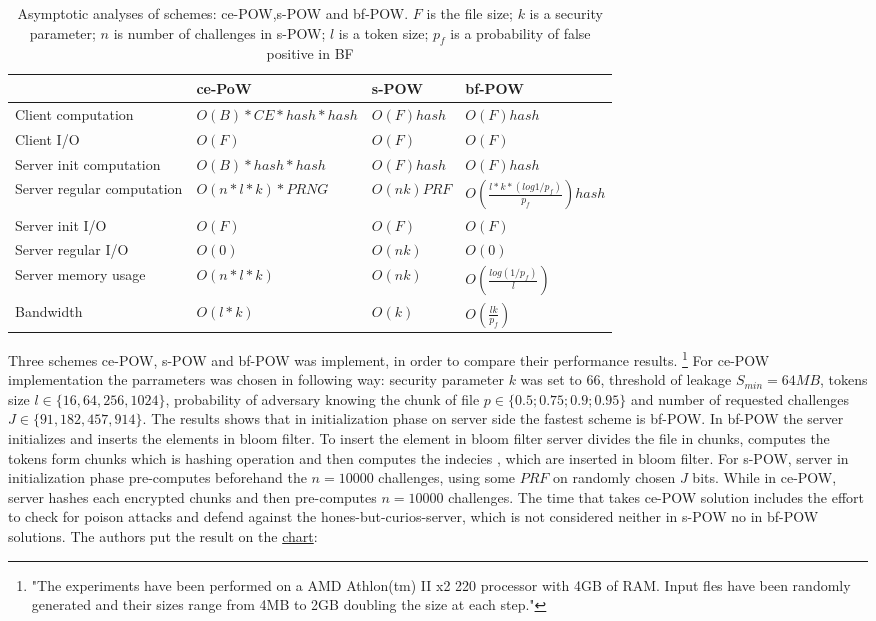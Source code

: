 \documentclass[12pt]{article}
\begin{document}
\begin{savenotes}
\begin{table}[!htpb]
\centering
\addtolength{\tabcolsep}{3pt}
\begin{tabular}{|L{4cm}|L{4cm}|L{2.5cm}|L{3.5cm}|}
\hline
&ce-PoW&s-POW&bf-POW\\
\hline
Client computation&$O(B)*CE*hash*hash$ & $O(F)hash$ & $O(F)hash$ \\
\hline
Client I/O&$O(F)$&$O(F)$&$O(F)$\\
\hline
Server init computation &$O(B)*hash*hash$&$O(F) hash$&$O(F)hash$\\
\hline
Server regular computation &$O(n * l *k)*PRNG$&$O(nk) PRF$& $O(\frac{l*k*(log1/p_f)}{p_f})hash$\\
\hline
Server init I/O &$O(F)$&$O(F)$&$O(F)$\\
\hline
Server regular I/O &$O(0)$&$O(nk)$&$O(0)$\\
\hline
Server memory usage&$O(n * l *k)$&$O(nk)$&$O(\frac{log(1/p_f)}{l})$\\
\hline
Bandwidth&$O(l *k)$&$O(k)$&$O(\frac{lk}{p_f})$\\
\hline
\end{tabular}
\caption{Asymptotic analyses of schemes: ce-POW,s-POW and bf-POW. $F$ is the file size; $k$ is a security parameter; $n$ is number of challenges in s-POW;  $l$ is a token size; $p_f$ is a probability of false positive in BF \cite{ce-POW}}
\label{table:asymptoticAnalysisCE-POW}
\end{table}
\end{savenotes}

Three schemes ce-POW, s-POW and bf-POW was implement, in order to compare their performance results. \footnote{"The experiments have been performed on a AMD Athlon(tm) II x2 220
processor with 4GB of RAM. Input fles have been randomly generated and their sizes range from 4MB to 2GB doubling the size at each step."} For ce-POW implementation the parrameters was chosen in following way: security parameter $k$ was set to $66$, threshold of leakage $S_{min} = 64MB$, tokens size $l \in \{16, 64, 256,1024\} $, probability of adversary knowing the  chunk of file $p \in \{0.5; 0.75; 0.9; 0.95\}$ and number of requested challenges $J \in \{91, 182, 457, 914\}$.
The results shows that in initialization phase on server side the fastest scheme is bf-POW. In bf-POW the server initializes and inserts the elements in bloom filter. To insert the element in bloom filter server divides the file in chunks, computes the tokens form chunks which is hashing operation and then computes the indecies , which are inserted  in bloom filter. For s-POW, server in initialization phase pre-computes beforehand the $n=10000$ challenges, using some $PRF$ on randomly chosen $J$ bits. While in ce-POW, server hashes each encrypted chunks and then pre-computes $n=10000$ challenges. The time that takes ce-POW solution includes the effort to check for poison attacks and defend against the hones-but-curios-server, which is not considered neither in s-POW no in bf-POW solutions. The authors put the result on the \hyperref[fig:ce-POW]{chart}:
\end{document}
